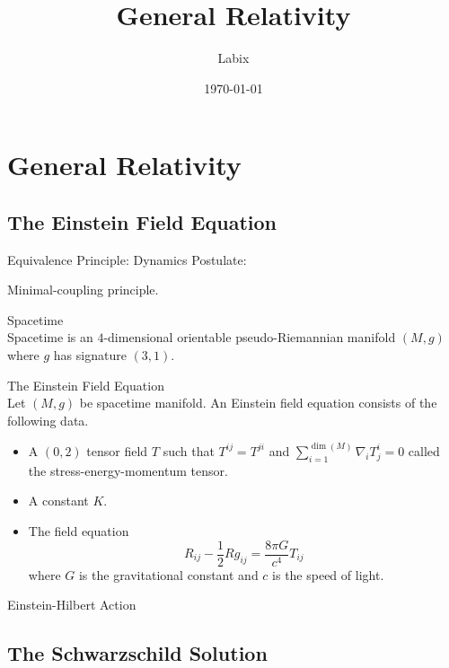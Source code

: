 \documentclass[a4paper]{article}
\title{General Relativity}
\author{Labix}
\date{\today}
\begin{document}
\maketitle
\pagebreak
\tableofcontents

\pagebreak
\section{General Relativity}
\subsection{The Einstein Field Equation}
Equivalence Principle:
Dynamics Postulate: 

Minimal-coupling principle. 

\begin{defn}{Spacetime}{}\\
Spacetime is an $4$-dimensional orientable pseudo-Riemannian manifold $(M,g)$ where $g$ has signature $(3,1)$. 
\end{defn}

\begin{defn}{The Einstein Field Equation}{}\\
Let $(M,g)$ be spacetime manifold. An Einstein field equation consists of the following data. 
\begin{itemize}
\item A $(0,2)$ tensor field $T$ such that $T^{ij}=T^{ji}$ and $\sum_{i=1}^{\dim(M)}\nabla_iT_j^i=0$ called the stress-energy-momentum tensor. 
\item A constant $K$. 
\item The field equation $$R_{ij}-\frac{1}{2}Rg_{ij}=\frac{8\pi G}{c^4}T_{ij}$$ where $G$ is the gravitational constant and $c$ is the speed of light. 
\end{itemize}
\end{defn}

\begin{defn}{Einstein-Hilbert Action}{}
\end{defn}

\subsection{The Schwarzschild Solution}
\end{document}
